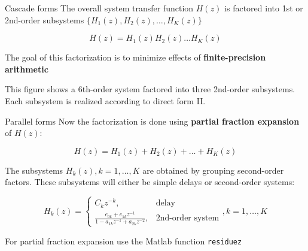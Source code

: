 \documentclass[10pt, aspectratio=169, handout]{beamer}
\begin{document}
\begin{frame}{Cascade forms}
	The overall system transfer function  $H(z)$ is factored into 1st or 2nd-order subsystems $\{H_1(z),H_2(z),\ldots, H_K(z)\}$
	
	\begin{equation*}
	H(z) = H_1(z)H_2(z)\ldots H_K(z)
	\end{equation*}
	
	The goal of this factorization is to minimize effects of \textbf{finite-precision arithmetic}
	
\begin{center}
\end{center}

This figure shows a 6th-order system factored into three 2nd-order subsystems. Each subsystem is realized according to direct form II.
\end{frame}

\begin{frame}{Parallel forms}
	Now the factorization is done using \textbf{partial fraction expansion} of $H(z)$:
	
	\begin{equation*}
	H(z) = H_1(z) + H_2(z) + \ldots + H_K(z)
	\end{equation*}
	
	The subsystems $H_k(z), k = 1, \ldots, K$ are obtained by grouping second-order factors. These subsystems will either be simple delays or second-order systems:
	
	\begin{equation*}
	H_k(z) = \begin{cases}
	C_kz^{-k}, & \text{delay} \\
	\displaystyle\frac{e_{0k} + e_{1k}z^{-1}}{1 - a_{1k}z^{-1} + a_{2k}z^{-2}}, & \text{2nd-order system}
	\end{cases}, k = 1,\ldots, K
	\end{equation*}
	
	For partial fraction expansion use the Matlab function \texttt{residuez}
\end{frame}
\end{document}
